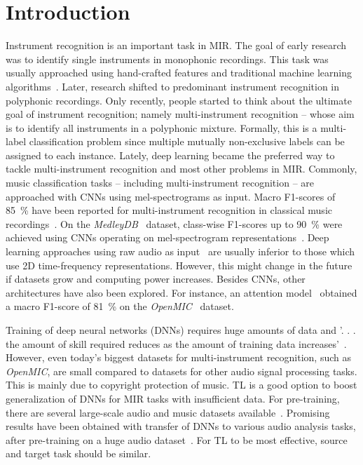 \documentclass{article}
\begin{document}
\section{Introduction}
\label{sec:intro}
Instrument recognition is an important task in MIR. The goal of early research was to identify single instruments in monophonic recordings. This task was usually approached using hand-crafted features and traditional machine learning algorithms~\cite{eronen2000musical, david2004efficient}. Later, research shifted to predominant instrument recognition in polyphonic recordings. Only recently, people started to think about the ultimate goal of instrument recognition; namely multi-instrument recognition – whose aim is to identify all instruments in a polyphonic mixture. Formally, this is a multi-label classification problem since multiple mutually non-exclusive labels can be assigned to each instance. Lately, deep learning became the preferred way to tackle multi-instrument recognition and most other problems in MIR. Commonly, music classification tasks -- including multi-instrument recognition -- are approached with CNNs using mel-spectrograms as input. Macro F1-scores of \SI{85}{\percent} have been reported for multi-instrument recognition in classical music recordings~\cite{seipel2018music}. On the \textit{MedleyDB}~\cite{bittner2014medleydb} dataset, class-wise F1-scores up to \SI{90}{\percent} were achieved using CNNs operating on mel-spectrogram representations~\cite{kadandale2018musical}. Deep learning approaches using raw audio as input~\cite{li2015automatic} are usually inferior to those which use 2D time-frequency representations. However, this might change in the future if datasets grow and computing power increases. Besides CNNs, other architectures have also been explored. For instance, an attention model~\cite{gururani2019attention} obtained a macro F1-score of \SI{81}{\percent} on the \textit{OpenMIC}~\cite{humphrey2018openmic} dataset.

Training of deep neural networks (DNNs) requires huge amounts of data and ’. . . the amount of skill required reduces as the amount of training data increases’~\cite[p.~19]{goodfellow2016book}. However, even today's biggest datasets for multi-instrument recognition, such as \textit{OpenMIC}, are small compared to datasets for other audio signal processing tasks. This is mainly due to copyright protection of music. TL is a good option to boost generalization of DNNs for MIR tasks with insufficient data. For pre-training, there are several large-scale audio and music datasets available~\cite{gemmeke2017audioset, bertin2011msd}. Promising results have been obtained with transfer of DNNs to various audio analysis tasks, after pre-training on a huge audio dataset~\cite{kong2020panns}. For TL to be most effective, source and target task should be similar. 
\end{document}
